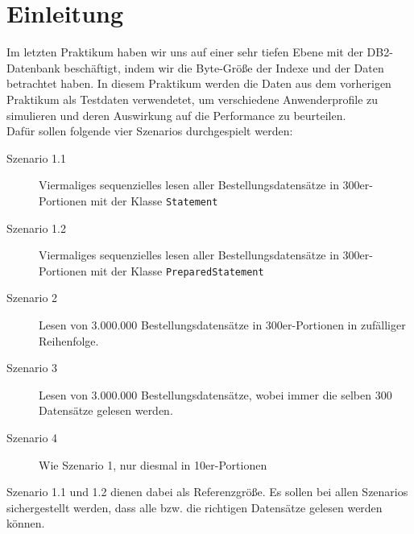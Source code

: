 \chapter{Einleitung}
Im letzten Praktikum haben wir uns auf einer sehr tiefen Ebene mit der DB2-Datenbank beschäftigt, indem wir die Byte-Größe der Indexe und der Daten betrachtet haben. In diesem Praktikum werden die Daten aus dem vorherigen Praktikum als Testdaten verwendetet, um verschiedene Anwenderprofile zu simulieren und deren Auswirkung auf die Performance zu beurteilen. \\

Dafür sollen folgende vier Szenarios durchgespielt werden:
\begin{description}
\item[Szenario 1.1] Viermaliges sequenzielles lesen aller Bestellungsdatensätze in 300er-Portionen mit der Klasse \texttt{Statement}
\item[Szenario 1.2] Viermaliges sequenzielles lesen aller Bestellungsdatensätze in 300er-Portionen mit der Klasse \texttt{PreparedStatement}
\item[Szenario 2] Lesen von 3.000.000 Bestellungsdatensätze in 300er-Portionen in zufälliger Reihenfolge.
\item[Szenario 3] Lesen von 3.000.000 Bestellungsdatensätze, wobei immer die selben 300 Datensätze gelesen werden.
\item[Szenario 4] Wie Szenario 1, nur diesmal in 10er-Portionen
\end{description}

Szenario 1.1 und 1.2 dienen dabei als Referenzgröße. Es sollen bei allen Szenarios sichergestellt werden, dass alle bzw. die richtigen Datensätze gelesen werden können. 